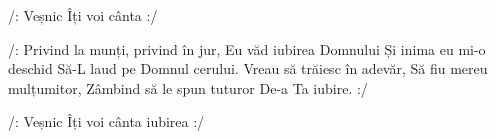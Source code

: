 \beginverse*
/: Veșnic Îți voi cânta :/
\endverse

\beginverse
/: Privind la munți, privind în jur,
Eu văd iubirea Domnului
Și inima eu mi-o deschid
Să-L laud pe Domnul cerului.
Vreau să trăiesc în adevăr,
Să fiu mereu mulțumitor,
Zâmbind să le spun tuturor
De-a Ta iubire. :/
\endverse

\beginchorus
/: Veșnic Îți voi cânta iubirea :/
\endchorus
\endsong